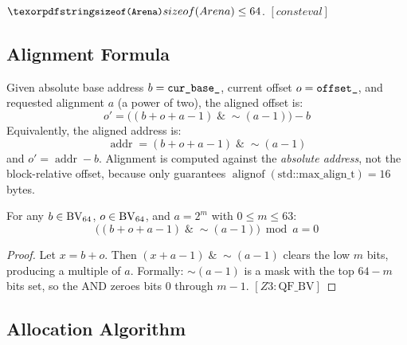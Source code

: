 \begin{invariant}
$\code{sizeof(Arena)} \leq 64$. \quad$[\textit{consteval}]$
\end{invariant}

\subsection{Alignment Formula}

\begin{definition}
\label{def:arena-align}
Given absolute base address $b = \texttt{cur\_base\_}$, current offset $o = \texttt{offset\_}$,
and requested alignment $a$ (a power of two), the aligned offset is:
\[
  o' = \bigl((b + o + a - 1) \;\mathbin{\&}\; {\sim}(a-1)\bigr) - b
\]
Equivalently, the aligned address is:
\[
  \operatorname{addr} = (b + o + a - 1) \;\mathbin{\&}\; {\sim}(a-1)
\]
and $o' = \operatorname{addr} - b$.
Alignment is computed against the \emph{absolute address}, not the
block-relative offset, because  only guarantees
$\operatorname{alignof}(\text{std::max\_align\_t}) = 16$ bytes.
\end{definition}

\begin{theorem}
\label{thm:arena-align}
For any $b \in \mathrm{BV}_{64}$, $o \in \mathrm{BV}_{64}$, and $a = 2^m$ with $0 \le m \le 63$:
\[
  \bigl((b + o + a - 1) \;\mathbin{\&}\; {\sim}(a-1)\bigr) \bmod a = 0
\]
\end{theorem}
\begin{proof}
Let $x = b + o$.  Then $(x + a - 1) \;\mathbin{\&}\; {\sim}(a-1)$
clears the low $m$ bits, producing a multiple of $a$.
Formally: ${\sim}(a-1)$ is a mask with the top $64-m$ bits set, so
the AND zeroes bits $0$ through $m-1$.
$[\textit{Z3}: \text{QF\_BV}]$
\end{proof}

\subsection{Allocation Algorithm}

